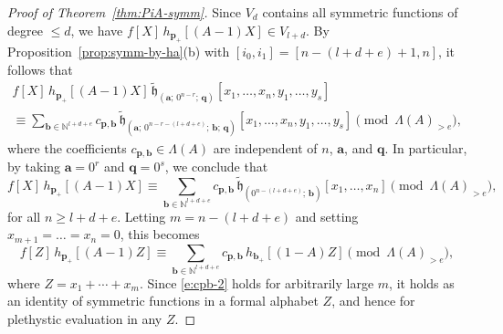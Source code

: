 \documentclass[10pt,a4paper]{amsart}
\newcommand{\NN}{{\mathbb N}}
\newcommand{\aA}{{\mathbf a}}
\newcommand{\bb}{{\mathbf b}}
\newcommand{\pp}{{\mathbf p}}
\newcommand{\qq}{{\mathbf q}}
\newcommand{\tfh}{{\widetilde{\mathfrak h}}}
\begin{document}
\begin{proof}[Proof of Theorem~\ref{thm:PiA-symm}]
Since $V_{d}$ contains all symmetric
functions of degree $\leq d$, we have $f[X]\, h_{\pp _{+}}[(A-1)X] \in
V_{l+d}$.  By Proposition~\ref{prop:symm-by-ha}(b) with
$[i_{0},i_{1}]= [n-(l+d+e)+1,n]$, it follows that
\begin{multline}\label{e:p-term}
f[X]\, h_{\pp _{+}}[(A-1)X]\, \tfh_{(\aA ;\, 0^{n-r};\, \qq)
}[x_{1}, \ldots, x_{n}, y_{1}, \ldots, y_{s}]\\
\equiv \sum _{\bb \in \NN ^{l+d+e}} c_{\pp ,\bb }\, \tfh_{(\aA ;\,
0^{n-r-(l+d+e)};\, \bb ;\, \qq )} [x_{1}, \ldots, x_{n}, y_{1},
\ldots, y_{s}] \pmod{\Lambda (A)_{>e}},
\end{multline}
where the coefficients $c_{\pp ,\bb }\in \Lambda (A)$ are independent
of $n$, $\aA $, and $\qq $.  In particular, by taking $\aA = 0^{r}$
and $\qq = 0^{s}$, we conclude that
\begin{equation}\label{e:cpb-1}
f[X]\, h_{\pp _{+}}[(A-1)X] \equiv \sum _{\bb \in \NN ^{l+d+e}} c_{\pp
,\bb }\, \tfh_{( 0^{n-(l+d+e)};\, \bb )} [x_{1}, \ldots, x_{n}]
\pmod{\Lambda (A)_{>e}},
\end{equation}
for all $n\geq l+d+e$.  Letting $m=n-(l+d+e)$ and setting $x_{m+1} =
\ldots = x_{n} = 0$, this becomes
\begin{equation}\label{e:cpb-2}
f[Z]\, h_{\pp _{+}}[(A-1)Z] \equiv \sum _{\bb \in \NN ^{l+d+e}} c_{\pp
,\bb }\, h _{\bb _{+}} [(1-A)Z] \pmod{\Lambda (A)_{>e}},
\end{equation}
where $Z = x_{1}+\cdots +x_{m}$.  Since \eqref{e:cpb-2} holds for
arbitrarily large $m$, it holds as an identity of symmetric functions
in a formal alphabet $Z$, and hence for plethystic evaluation in any
$Z$.


\end{proof}
\end{document}
